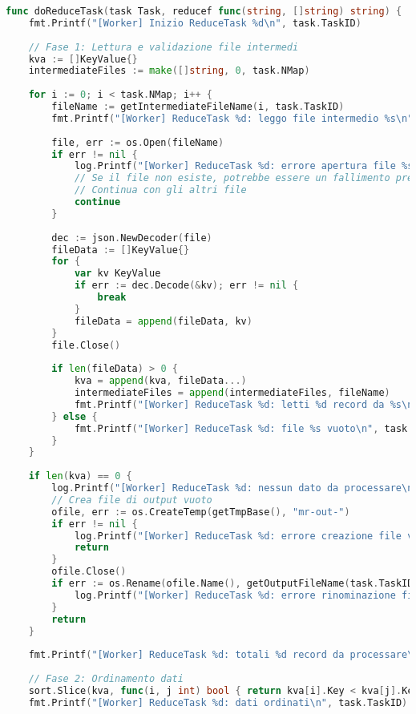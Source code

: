 \documentclass[12pt,a4paper]{article}
\begin{document}
\begin{lstlisting}[language=go]
func doReduceTask(task Task, reducef func(string, []string) string) {
    fmt.Printf("[Worker] Inizio ReduceTask %d\n", task.TaskID)
    
    // Fase 1: Lettura e validazione file intermedi
    kva := []KeyValue{}
    intermediateFiles := make([]string, 0, task.NMap)
    
    for i := 0; i < task.NMap; i++ {
        fileName := getIntermediateFileName(i, task.TaskID)
        fmt.Printf("[Worker] ReduceTask %d: leggo file intermedio %s\n", task.TaskID, fileName)
        
        file, err := os.Open(fileName)
        if err != nil {
            log.Printf("[Worker] ReduceTask %d: errore apertura file %s: %v", task.TaskID, fileName, err)
            // Se il file non esiste, potrebbe essere un fallimento precedente
            // Continua con gli altri file
            continue
        }
        
        dec := json.NewDecoder(file)
        fileData := []KeyValue{}
        for {
            var kv KeyValue
            if err := dec.Decode(&kv); err != nil {
                break
            }
            fileData = append(fileData, kv)
        }
        file.Close()
        
        if len(fileData) > 0 {
            kva = append(kva, fileData...)
            intermediateFiles = append(intermediateFiles, fileName)
            fmt.Printf("[Worker] ReduceTask %d: letti %d record da %s\n", task.TaskID, len(fileData), fileName)
        } else {
            fmt.Printf("[Worker] ReduceTask %d: file %s vuoto\n", task.TaskID, fileName)
        }
    }
    
    if len(kva) == 0 {
        log.Printf("[Worker] ReduceTask %d: nessun dato da processare\n", task.TaskID)
        // Crea file di output vuoto
        ofile, err := os.CreateTemp(getTmpBase(), "mr-out-")
        if err != nil {
            log.Printf("[Worker] ReduceTask %d: errore creazione file vuoto: %v", task.TaskID, err)
            return
        }
        ofile.Close()
        if err := os.Rename(ofile.Name(), getOutputFileName(task.TaskID)); err != nil {
            log.Printf("[Worker] ReduceTask %d: errore rinominazione file vuoto: %v", task.TaskID, err)
        }
        return
    }
    
    fmt.Printf("[Worker] ReduceTask %d: totali %d record da processare\n", task.TaskID, len(kva))
    
    // Fase 2: Ordinamento dati
    sort.Slice(kva, func(i, j int) bool { return kva[i].Key < kva[j].Key })
    fmt.Printf("[Worker] ReduceTask %d: dati ordinati\n", task.TaskID)
    

\end{lstlisting}
\end{document}
